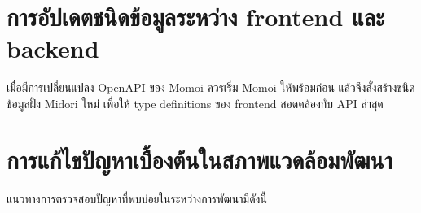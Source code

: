 \section{การอัปเดตชนิดข้อมูลระหว่าง frontend และ backend}
\hspace*{1.3em}
เมื่อมีการเปลี่ยนแปลง OpenAPI ของ Momoi ควรเริ่ม Momoi ให้พร้อมก่อน แล้วจึงสั่งสร้างชนิดข้อมูลฝั่ง Midori ใหม่ เพื่อให้ type definitions ของ frontend สอดคล้องกับ API ล่าสุด

\begin{figure}[htbp]
\centering
{}
\caption{}
\label{figG:ApiGen}
\end{figure}

\section{การแก้ไขปัญหาเบื้องต้นในสภาพแวดล้อมพัฒนา}
\hspace*{1.3em}
แนวทางการตรวจสอบปัญหาที่พบบ่อยในระหว่างการพัฒนามีดังนี้

